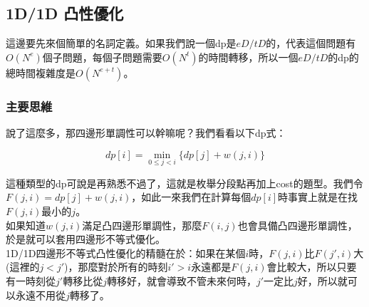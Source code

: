 \documentclass[main.tex]{subfiles}
\begin{document}
	
	\subsection{1D/1D 凸性優化}
	
	這邊要先來個簡單的名詞定義。如果我們說一個dp是$eD/tD$的，代表這個問題有$O(N^e)$個子問題，每個子問題需要$O(N^t)$的時間轉移，所以一個$eD/tD$的dp的總時間複雜度是$O(N^{e+t})$。
	
	\subsubsection{主要思維}
	
	說了這麼多，那四邊形單調性可以幹嘛呢？我們看看以下dp式：
	
	\begin{displaymath}
	dp[i] = \min\limits_{0\leq j < i} \{dp[j] + w(j, i) \}
	\end{displaymath}
	
	這種類型的dp可說是再熟悉不過了，這就是枚舉分段點再加上cost的題型。我們令$F(j, i) = dp[j] + w(j, i)$，如此一來我們在計算每個$dp[i]$時事實上就是在找$F(j, i)$最小的$j$。\\
	
	如果知道$w(j, i)$滿足凸四邊形單調性，那麼$F(i, j)$也會具備凸四邊形單調性，於是就可以套用四邊形不等式優化。\\
	
	1D/1D四邊形不等式凸性優化的精髓在於：如果在某個$i$時，$F(j, i)$比$F(j', i)$大(這裡的$j < j'$)，那麼對於所有的時刻$i' > i$永遠都是$F(j, i)$會比較大，所以只要有一時刻從$j'$轉移比從$j$轉移好，就會導致不管未來何時，$j'$一定比$j$好，所以就可以永遠不用從$j$轉移了。\\
	
\end{document}
